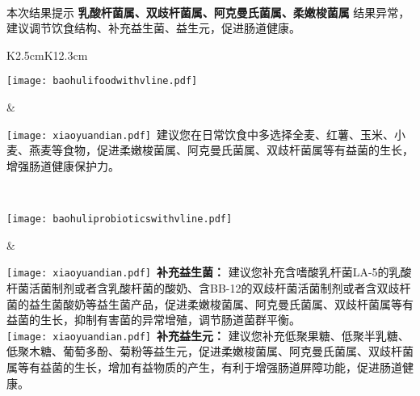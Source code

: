 \noindent\fontsize{12pt}{12pt}\selectfont {菌群调理建议} \\

\vspace*{-2mm}
\begin{spacing}{1.3}
\noindent\fontsize{9pt}{11pt}\selectfont
本次结果提示 {\bf 乳酸杆菌属、双歧杆菌属、阿克曼氏菌属、柔嫩梭菌属} 结果异常，建议调节饮食结构、补充益生菌、益生元，促进肠道健康。
\end{spacing}

\setlength{\arrayrulewidth}{.5pt}
\vspace*{-2mm}
\begin{center}
\begin{tabular}{K{2.5cm}K{12.3cm}}
\hline

\parbox[c][3cm]{.95\hsize}{
\noindent
\texttt{[image: baohulifoodwithvline.pdf]}
}
 &
\parbox{\hsize}{
\vspace*{0.5mm}
\begin{spacing}{1.5}
\fontsize{10pt}{10pt}
{\texttt{[image: xiaoyuandian.pdf]}\fontsize{9pt}{10pt}\selectfont \ 建议您在日常饮食中多选择全麦、红薯、玉米、小麦、燕麦等食物，促进柔嫩梭菌属、阿克曼氏菌属、双歧杆菌属等有益菌的生长，增强肠道健康保护力。}
\end{spacing}
} \\
\hline

\parbox[c][4.5cm]{.95\hsize}{
\noindent
\texttt{[image: baohuliprobioticswithvline.pdf]}
}
 &
\parbox{\hsize}{
\vspace*{0.5mm}
\begin{spacing}{1.5}
\fontsize{10pt}{10pt}
{\texttt{[image: xiaoyuandian.pdf]}\fontsize{9pt}{10pt}\selectfont \ {\bf {补充益生菌：}} 建议您补充含嗜酸乳杆菌LA-5的乳酸杆菌活菌制剂或者含乳酸杆菌的酸奶、含BB-12的双歧杆菌活菌制剂或者含双歧杆菌的益生菌酸奶等益生菌产品，促进柔嫩梭菌属、阿克曼氏菌属、双歧杆菌属等有益菌的生长，抑制有害菌的异常增殖，调节肠道菌群平衡。 \\}
{\texttt{[image: xiaoyuandian.pdf]}\fontsize{9pt}{10pt}\selectfont \ {\bf {补充益生元：}} 建议您补充低聚果糖、低聚半乳糖、低聚木糖、葡萄多酚、菊粉等益生元，促进柔嫩梭菌属、阿克曼氏菌属、双歧杆菌属等有益菌的生长，增加有益物质的产生，有利于增强肠道屏障功能，促进肠道健康。}
\end{spacing}
} \\
\hline

\end{tabular}
\end{center}




